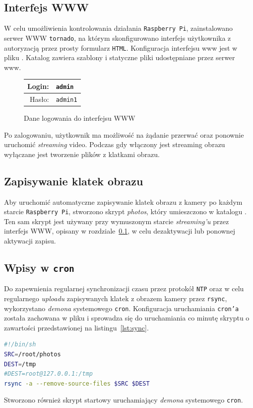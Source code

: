 \documentclass{article}
\begin{document}
\subsection{Interfejs WWW}
\label{sec:www}

W celu umożliwienia kontrolowania działania \texttt{Raspberry~Pi}, zainstalowano serwer WWW \texttt{tornado}, na którym skonfigurowano interfejs użytkownika z autoryzacją przez prosty formularz \texttt{HTML}. Konfiguracja interfejsu www jest w pliku . Katalog  zawiera szablony i statyczne pliki udostępniane przez serwer www.
\begin{figure}[H]
\centering
\begin{tabular}{r|l}
Login: & \texttt{admin}\\
\hline
Hasło: & \texttt{admin1}\\
\end{tabular}
\caption{Dane logowania do interfejsu WWW}
\end{figure}
Po zalogowaniu, użytkownik ma możliwość na żądanie przerwać oraz ponownie uruchomić \emph{streaming} video. Podczas gdy włączony jest streaming obrazu wyłączane jest tworzenie plików z klatkami obrazu.


\subsection{Zapisywanie klatek obrazu}

Aby uruchomić automatyczne zapisywanie klatek obrazu z kamery po każdym starcie \texttt{Raspberry~Pi}, stworzono skrypt \emph{photos}, który umieszczono w katalogu . Ten sam skrypt jest używany przy wymuszonym starcie \emph{streaming'u} przez interfejs WWW, opisany w rozdziale~\ref{sec:www}, w celu dezaktywacji lub ponownej aktywacji zapisu.


\subsection{Wpisy w \texttt{cron}}

Do zapewnienia regularnej synchronizacji czasu przez protokół \texttt{NTP} oraz w celu regularnego \emph{uploadu} zapisywanych klatek z obrazem kamery przez \texttt{rsync}, wykorzystano \emph{demona} systemowego \texttt{cron}. Konfiguracja uruchamiania \texttt{cron'a} została zachowana w pliku  i sprowadza się do uruchamiania co minutę skryptu  o zawartości przedstawionej na listingu~\ref{lst:sync}.
\begin{lstlisting}[caption={Zawartość pliku \texttt{/root/sync.sh}},label=lst:sync,language=bash,frame=single,breaklines,captionpos=b]
#!/bin/sh
SRC=/root/photos
DEST=/tmp
#DEST=root@127.0.0.1:/tmp
rsync -a --remove-source-files $SRC $DEST
\end{lstlisting}
Stworzono również skrypt startowy  uruchamiający \emph{demona} systemowego \texttt{cron}.
\end{document}
